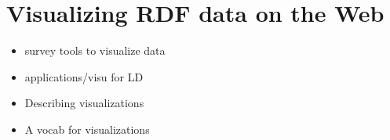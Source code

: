 \chapter{Visualizing RDF data on the Web }
\label{ch:ch3}

\begin{itemize}
\item survey tools to visualize data
\item applications/visu for LD
\item Describing visualizations 
\item A vocab for visualizations
\end{itemize}




